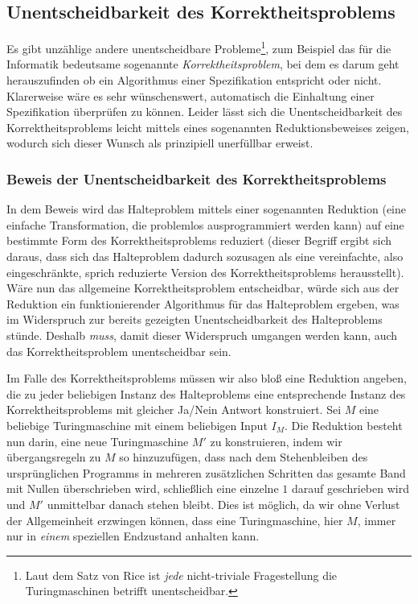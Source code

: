 \subsection{Unentscheidbarkeit des Korrektheitsproblems}
%
Es gibt unzählige andere unentscheidbare Probleme\footnote{Laut dem Satz von Rice ist \emph{jede} nicht-triviale Fragestellung die Turingmaschinen betrifft unentscheidbar.}, zum Beispiel das für die Informatik bedeutsame sogenannte \emph{Korrektheitsproblem}, bei dem es darum geht herauszufinden ob ein Algorithmus einer Spezifikation entspricht oder nicht. Klarerweise wäre es sehr wünschenswert, automatisch die Einhaltung einer Spezifikation überprüfen zu können. Leider lässt sich die Unentscheidbarkeit des Korrektheitsproblems leicht mittels eines sogenannten Reduktionsbeweises zeigen, wodurch sich dieser Wunsch als prinzipiell unerfüllbar erweist.

\subsubsection{Beweis der Unentscheidbarkeit des Korrektheitsproblems}
%
In dem Beweis wird das Halteproblem mittels einer sogenannten Reduktion (eine einfache Transformation, die problemlos ausprogrammiert werden kann) auf eine bestimmte Form des Korrektheitsproblems reduziert (dieser Begriff ergibt sich daraus, dass sich das Halteproblem dadurch sozusagen als eine vereinfachte, also eingeschränkte, sprich reduzierte Version des Korrektheitsproblems herausstellt). Wäre nun das allgemeine Korrektheitspro\-blem entscheid\-bar, würde sich aus der Reduktion ein funktionierender Algorithmus für das Halteproblem ergeben, was im Widerspruch zur bereits gezeigten Unentscheidbarkeit des Halteproblems stünde. Deshalb \emph{muss}, damit dieser Widerspruch umgangen werden kann, auch das Korrekt\-heitsproblem unentscheidbar sein.

Im Falle des Korrektheitsproblems müssen wir also bloß eine Reduktion angeben, die zu jeder beliebigen Instanz des Halteproblems eine entsprechende Instanz des Korrektheits\-problems mit gleicher Ja/Nein Antwort konstruiert. Sei $M$ eine beliebige Turingmaschine mit einem beliebigen Input $I_M$. Die Reduktion besteht nun darin, eine neue Turingmaschine $M'$ zu konstruieren, indem wir übergangsregeln zu $M$ so hinzuzufügen, dass nach dem Stehenbleiben des ursprünglichen Programms in mehreren zusätzlichen Schritten das gesamte Band mit Nullen überschrieben wird, schließlich eine einzelne $1$ darauf geschrieben wird und $M'$ unmittelbar danach stehen bleibt. Dies ist möglich, da wir ohne Verlust der Allgemeinheit erzwingen können, dass eine Turingmaschine, hier $M$, immer nur in \emph{einem} speziellen Endzustand anhalten kann.

